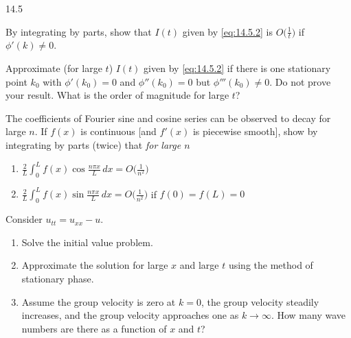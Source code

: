 \begin{exercises}{14.5}
\item By integrating by parts, show that $I(t)$ given by \eqref{eq:14.5.2} is $O\bigl(\frac{1}{t}\bigr)$ if $\phi'(k) \neq 0$.

\item Approximate (for large $t$) $I(t)$ given by \eqref{eq:14.5.2} if there is one stationary point $k_0$ with $\phi'(k_0) = 0$ and $\phi''(k_0) = 0$ but $\phi'''(k_0) \neq 0$.  Do not prove your result.  What is the order of magnitude for large $t$?

\item The coefficients of Fourier sine and cosine series can be observed to decay for large $n$.  If $f(x)$ is continuous [and $f'(x)$ is piecewise smooth], show by integrating by parts (twice) that \emph{for large $n$}
\begin{enumerate}
\item[(a)] $\frac{2}{L}\int_0^L f(x)\cos\frac{n\pi x}{L}\,dx = O\bigl(\frac{1}{n^2}\bigr)$
\item[(b)] $\frac{2}{L}\int_0^L f(x)\sin\frac{n\pi x}{L}\,dx = O\bigl(\frac{1}{n^2}\bigr)$ if $f(0) = f(L) = 0$
\end{enumerate}

\item Consider $u_{tt} = u_{xx} - u$.
\begin{enumerate}
\item[(a)] Solve the initial value problem.
\item[(b)] Approximate the solution for large $x$ and large $t$ using the method of stationary phase.
\item[(c)] Assume the group velocity is zero at $k = 0$, the group velocity steadily increases, and the group velocity approaches one as $k \to \infty$.  How many wave numbers are there as a function of $x$ and $t$?
\end{enumerate}
\end{exercises}
